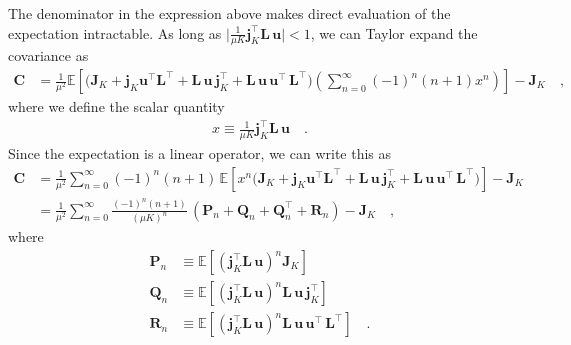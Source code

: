 \documentclass[modern]{aastex62}
\begin{document}
%
The denominator in the expression above makes direct evaluation of the expectation
intractable. As long as
$\big| \frac{1}{\mu K}\mathbf{j}_K^\top \mathbf{L} \, \mathbf{u} \big| < 1$, we
can Taylor expand the covariance as
%
\begin{align}
    \mathbf{C}
     & =
    \frac{1}{\mu^2}
    \mathbb{E}\left[
        \Bigg(
        \mathbf{J}_K
        +
        \mathbf{j}_K\mathbf{u}^\top \mathbf{L}^\top
        +
        \mathbf{L} \, \mathbf{u} \, \mathbf{j}_K^\top
        +
        \mathbf{L} \, \mathbf{u} \, \mathbf{u}^\top \, \mathbf{L}^\top
        \Bigg)
        \left(
        \sum\limits_{n=0}^\infty
        (-1)^n (n + 1) x^n
        \right)
        \right]
    - \mathbf{J}_K
    \quad,
\end{align}
%
where we define the scalar quantity
%
\begin{align}
    x \equiv \frac{1}{\mu K}\mathbf{j}_K^\top \mathbf{L} \, \mathbf{u}
    \quad.
\end{align}
%
Since the expectation is a linear operator, we can write this as
%
\begin{align}
    \mathbf{C}
     & =
    \frac{1}{\mu^2}
    \sum\limits_{n=0}^\infty
    (-1)^n (n + 1)
    \,
    \mathbb{E}\left[
        x^n
        \Bigg(
        \mathbf{J}_K
        +
        \mathbf{j}_K\mathbf{u}^\top \mathbf{L}^\top
        +
        \mathbf{L} \, \mathbf{u} \, \mathbf{j}_K^\top
        +
        \mathbf{L} \, \mathbf{u} \, \mathbf{u}^\top \, \mathbf{L}^\top
        \Bigg)
        \right]
    - \mathbf{J}_K
    \nonumber \\[0.5em]
     & =
    \frac{1}{\mu^2}
    \sum\limits_{n=0}^\infty
    \frac{(-1)^n (n + 1)}{(\mu K)^n}
    \,
    \left(
    \mathbf{P}_n
    +
    \mathbf{Q}_n
    +
    \mathbf{Q}_n^\top
    +
    \mathbf{R}_n
    \right)
    - \mathbf{J}_K
    \quad,
\end{align}
%
where
%
\begin{align}
    \mathbf{P}_n & \equiv \mathbb{E}\left[ \left(\mathbf{j}_K^\top \mathbf{L} \, \mathbf{u}\right)^n \mathbf{J}_K \right]
    \nonumber                                                                                                                                                               \\[0.5em]
    \mathbf{Q}_n & \equiv \mathbb{E}\left[ \left(\mathbf{j}_K^\top \mathbf{L} \, \mathbf{u}\right)^n \mathbf{L} \, \mathbf{u} \, \mathbf{j}_K^\top \right]
    \nonumber                                                                                                                                                               \\[0.5em]
    \mathbf{R}_n & \equiv \mathbb{E}\left[ \left(\mathbf{j}_K^\top \mathbf{L} \, \mathbf{u}\right)^n \mathbf{L} \, \mathbf{u} \, \mathbf{u}^\top \, \mathbf{L}^\top \right]
    \quad.
\end{align}
\end{document}
